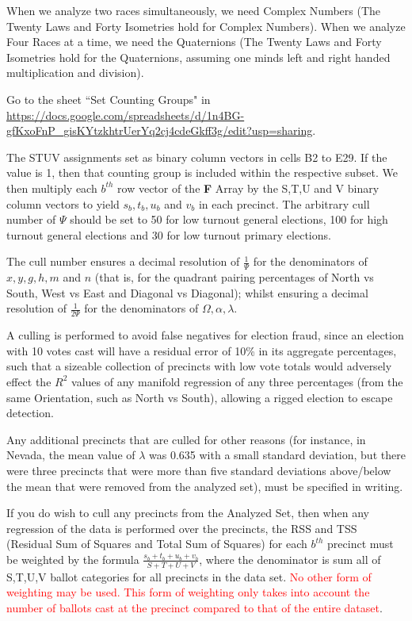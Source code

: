 \documentclass[preprint,13pt]{elsarticle}
\begin{document}
When we analyze two races simultaneously, we need Complex Numbers (The Twenty Laws and Forty Isometries hold for Complex Numbers). When we analyze Four Races at a time, we need the Quaternions (The Twenty Laws and Forty Isometries hold for the Quaternions, assuming one minds left and right handed multiplication and division).

Go to the sheet ``Set Counting Groups" in \url{https://docs.google.com/spreadsheets/d/1n4BG-gfKxoFnP_gisKYtzkhtrUerYq2cj4cdeGkff3g/edit?usp=sharing}.

The STUV assignments set as binary column vectors in cells B2 to E29. If the value is 1, then that counting group is included within the respective subset. We then multiply each $b^{th}$ row vector of the \textbf{F} Array by the S,T,U and V binary column vectors to yield $s_{b}, t_{b}, u_{b}$ and $v_{b}$ in each precinct.
\newpage
The arbitrary cull number of $\Psi$ should be set to 50 for low turnout general elections, 100 for high turnout general elections and 30 for low turnout primary elections.

The cull number ensures a decimal resolution of $\frac{1}{\Psi}$ for the denominators of $x,y,g,h,m$ and $n$ (that is, for the quadrant pairing percentages of North vs South, West vs East and Diagonal vs Diagonal); whilst ensuring a decimal resolution of $\frac{1}{2\Psi}$ for the denominators of $\Omega,\alpha,\lambda$. 

A culling is performed to avoid false negatives for election fraud, since an election with 10 votes cast will have a residual error of 10\% in its aggregate percentages, such that a sizeable collection of precincts with low vote totals would adversely effect the $R^2$ values of any manifold regression of any three percentages (from the same Orientation, such as North vs South), allowing a rigged election to escape detection. 

Any additional precincts that are culled for other reasons (for instance, in Nevada, the mean value of $\lambda$ was 0.635 with a small standard deviation, but there were three precincts that were more than five standard deviations above/below the mean that were removed from the analyzed set), must be specified in writing.

If you do wish to cull any precincts from the Analyzed Set, then when any regression of the data is performed over the precincts, the RSS and TSS (Residual Sum of Squares and Total Sum of Squares) for each $b^{th}$ precinct must be weighted by the formula $\frac{s_{b}+t_{b}+u_{b}+v_{b}}{S+T+U+V}$, where the denominator is sum all of S,T,U,V ballot categories for all precincts in the data set. \textcolor{red}{No other form of weighting may be used. This form of weighting only takes into account the number of ballots cast at the precinct compared to that of the entire dataset}.
\end{document}
